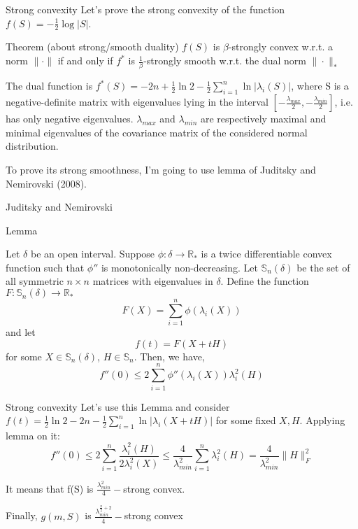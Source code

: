 \documentclass[10pt]{beamer}
\begin{document}
\begin{frame}{Strong convexity}
Let's prove the strong convexity of the function $f(S) = - \frac 12 \log |S|$.

\begin{block}{Theorem (about strong/smooth duality)}
$f(S)$ is $\beta$-strongly convex w.r.t. a norm $\| \cdot \|$ if and only if $f^*$ is $\frac 1{\beta}$-strongly smooth w.r.t. the dual norm $\|\cdot\|_*$

\end{block}

The dual function is $f^*(S) = -2n + \frac 12 \ln 2 - \frac 12 \sum_{i=1}^n \ln|\lambda_i(S)|$, where S is a negative-definite matrix with eigenvalues lying in the interval $\left[ -\frac{\lambda_{max}}{2}, -\frac{\lambda_{min}}{2}\right]$, i.e. has only negative eigenvalues. $\lambda_{max}$ and $\lambda_{min}$ are respectively maximal and minimal eigenvalues of the covariance matrix of the considered normal distribution.

To  prove its strong smoothness, I'm going to use lemma of Juditsky and Nemirovski (2008).

\end{frame}

\begin{frame}{Juditsky and Nemirovski}

\begin{block}{Lemma}

Let $\delta$ be an
open interval. Suppose $\phi : \delta \rightarrow \mathbb{R}_*$
is a twice differentiable convex function such that $\phi''$
is monotonically non-decreasing. Let $\mathbb{S}_n(\delta)$ be the set of all symmetric $n \times n$
matrices with eigenvalues in $\delta$. Define the function $F : \mathbb{S}_n(\delta) → \mathbb{R}_*$
\[
F(X) = \sum^n_{i=1} \phi (\lambda_i(X))
\]
and let
\[
f(t) = F(X + tH)
\]
for some $X \in \mathbb{S}_n (\delta)$, $H \in \mathbb{S}_n$. Then, we have,
\[
f''(0) \leq 2 \sum^n_{i=1} \phi'' (\lambda_i(X))\lambda_i^2(H)
\]
\end{block}

\end{frame}

\begin{frame}{Strong convexity}
Let's use this Lemma and consider $f(t) = \frac 12 \ln 2 - 2n - \frac 12 \sum_{i=1}^n \ln |\lambda_i(X+tH)|$ for some fixed $X,H$. Applying lemma on it:
\[
f''(0) \leq 2\sum_{i=1}^n \frac{\lambda_i^2(H)}{2\lambda_i^2(X)} \leq \frac 4{\lambda_{min}^2}\sum_{i=1}^n \lambda_i^2(H) = \frac 4{\lambda_{min}^2} \|H\|^2_F
\]

It means that f(S) is $\frac{\lambda_{min}^2}{4}-$strong convex.

Finally, $g(m,S)$ is $\frac{\lambda_{min}^{\frac n2 +2}}4 - $strong convex

\end{frame}
\end{document}
